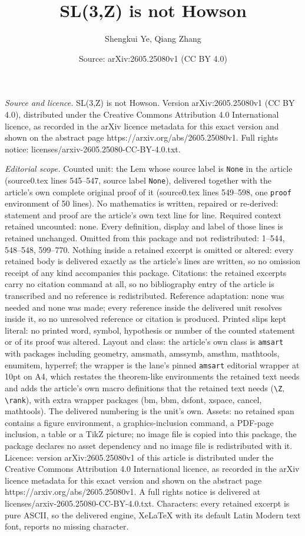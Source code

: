 \documentclass[10pt,a4paper]{amsart}
\title[SL(3,Z) is not Howson]{SL(3,Z) is not Howson}
\author{Shengkui Ye, Qiang Zhang}
\date{Source: arXiv:2605.25080v1 (CC BY 4.0)}
\begin{document}
\maketitle

\noindent\emph{Source and licence.} SL(3,Z) is not Howson. Version arXiv:2605.25080v1 (CC BY 4.0), distributed under the Creative Commons Attribution 4.0 International licence, as recorded in the arXiv licence metadata for this exact version and shown on the abstract page https://arxiv.org/abs/2605.25080v1. Full rights notice: licenses/arxiv-2605.25080-CC-BY-4.0.txt.\par\smallskip

\noindent\textit{Editorial scope.} Counted unit: the Lem whose source label is \texttt{None} in the article (source0.tex lines 545--547, source label \texttt{None}), delivered together with the article's own complete original proof of it (source0.tex lines 549--598, one \texttt{proof} environment of 50 lines). No mathematics is written, repaired or re-derived: statement and proof are the article's own text line for line. Required context retained uncounted: none. Every definition, display and label of those lines is retained unchanged. Omitted from this package and not redistributed: 1--544, 548--548, 599--770. Nothing inside a retained excerpt is omitted or altered: every retained body is delivered exactly as the article's lines are written, so no omission receipt of any kind accompanies this package. Citations: the retained excerpts carry no citation command at all, so no bibliography entry of the article is transcribed and no reference is redistributed. Reference adaptation: none was needed and none was made; every reference inside the delivered unit resolves inside it, so no unresolved reference or citation is produced. Printed slips kept literal: no printed word, symbol, hypothesis or number of the counted statement or of its proof was altered. Layout and class: the article's own class is \texttt{amsart} with packages including geometry, amsmath, amssymb, amsthm, mathtools, enumitem, hyperref; the wrapper is the lane's pinned \texttt{amsart} editorial wrapper at 10pt on A4, which restates the theorem-like environments the retained text needs and adds the article's own macro definitions that the retained text needs (\texttt{\textbackslash Z}, \texttt{\textbackslash rank}), with extra wrapper packages (bm, bbm, dsfont, xspace, cancel, mathtools). The delivered numbering is the unit's own. Assets: no retained span contains a figure environment, a graphics-inclusion command, a PDF-page inclusion, a table or a TikZ picture; no image file is copied into this package, the package declares no asset dependency and no image file is redistributed with it. Licence: version arXiv:2605.25080v1 of this article is distributed under the Creative Commons Attribution 4.0 International licence, as recorded in the arXiv licence metadata for this exact version and shown on the abstract page https://arxiv.org/abs/2605.25080v1. A full rights notice is delivered at licenses/arxiv-2605.25080-CC-BY-4.0.txt. Characters: every retained excerpt is pure ASCII, so the delivered engine, XeLaTeX with its default Latin Modern text font, reports no missing character.
\end{document}
